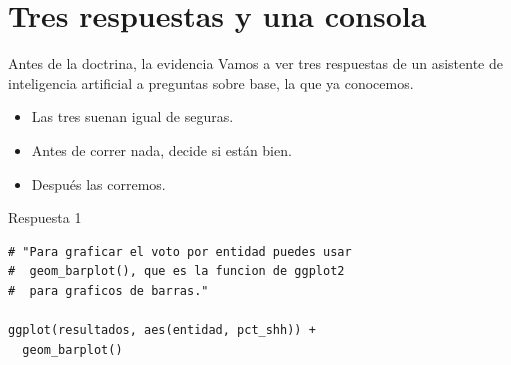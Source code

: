 \section{Tres respuestas y una consola}

\begin{frame}{Antes de la doctrina, la evidencia}
  \vspace{0.4em}
  Vamos a ver tres respuestas de un asistente de inteligencia artificial a
  preguntas sobre  base, la que ya conocemos.

  \vspace{1.0em}
  \begin{itemize}\setlength{\itemsep}{0.9em}
    \item<2-> Las tres suenan igual de seguras.
    \item<3-> Antes de correr nada, decide si están bien.
    \item<4-> Después las corremos.
  \end{itemize}
\end{frame}

\begin{frame}[fragile]{Respuesta 1}
\begin{lstlisting}
# "Para graficar el voto por entidad puedes usar
#  geom_barplot(), que es la funcion de ggplot2
#  para graficos de barras."

ggplot(resultados, aes(entidad, pct_shh)) +
  geom_barplot()
\end{lstlisting}

  \vspace{0.7em}
\end{frame}

